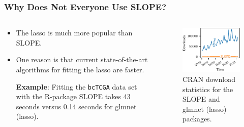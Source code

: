 \begin{frame}[c]
  \frametitle{Why Does Not Everyone Use SLOPE?}

  \begin{columns}
    \begin{column}{0.45\textwidth}
      \begin{itemize}
        \item<1-> The lasso is much more popular than SLOPE.
        \item<2-> One reason is that current state-of-the-art algorithms for fitting the lasso are faster.
              \medskip

              \textbf{Example}: Fitting the \texttt{bcTCGA} data set with the R-package SLOPE takes
              43 seconds versus 0.14 seconds for glmnet (lasso).
      \end{itemize}

    \end{column}
    \begin{column}{0.45\textwidth}
      \begin{figure}
        \centering
        \includegraphics[]{figures/cran-stats.pdf}
        \caption{%
          CRAN download statistics for the SLOPE and glmnet (lasso) packages.
        }
        \label{fig:cran-stats}
      \end{figure}
    \end{column}
  \end{columns}
\end{frame}

